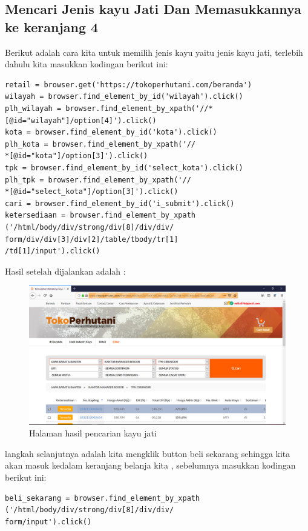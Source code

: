 \subsection{Mencari Jenis kayu Jati Dan Memasukkannya ke keranjang 4}
Berikut adalah cara kita untuk memilih jenis kayu yaitu jenis kayu jati, terlebih dahulu kita masukkan kodingan berikut ini: 
\begin{verbatim}
retail = browser.get('https://tokoperhutani.com/beranda')
wilayah = browser.find_element_by_id('wilayah').click()
plh_wilayah = browser.find_element_by_xpath('//*
[@id="wilayah"]/option[4]').click()
kota = browser.find_element_by_id('kota').click()
plh_kota = browser.find_element_by_xpath('//
*[@id="kota"]/option[3]').click()
tpk = browser.find_element_by_id('select_kota').click()
plh_tpk = browser.find_element_by_xpath('//
*[@id="select_kota"]/option[3]').click()
cari = browser.find_element_by_id('i_submit').click()
ketersediaan = browser.find_element_by_xpath
('/html/body/div/strong/div[8]/div/div/
form/div/div[3]/div[2]/table/tbody/tr[1]
/td[1]/input').click()
\end{verbatim}

Hasil setelah dijalankan adalah : 
\begin{figure}[h]
	\centering
	\includegraphics[scale=0.25]{figures/carikayu1}
	\caption{Halaman hasil pencarian kayu jati}
\end{figure}

\newpage
langkah selanjutnya adalah kita mengklik button beli sekarang sehingga kita akan masuk kedalam keranjang belanja kita , sebelumnya masukkan kodingan berikut ini: 
\begin{verbatim}
beli_sekarang = browser.find_element_by_xpath
('/html/body/div/strong/div[8]/div/div/
form/input').click()
\end{verbatim}

